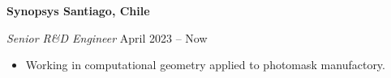 \documentclass[../main.tex]{subfiles}
\begin{document}
    \textbf{Synopsys \hfill  Santiago, Chile} \par
    \textit{Senior R\&D Engineer} \hfill April 2023 -- Now \par
    \begin{itemize}
        \item Working in computational geometry applied to photomask manufactory.
\end{itemize} \par
\end{document}
